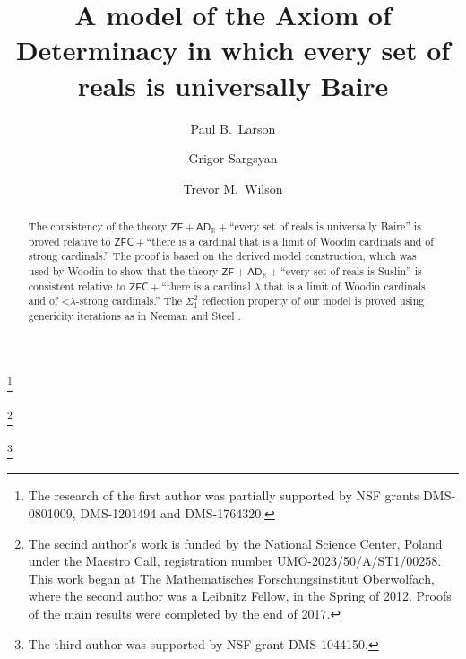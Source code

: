 \documentclass[fleqn, 11pt]{amsart}
\theoremstyle{plain}
\theoremstyle{definition}
\theoremstyle{remark}
\newcommand{\uB}{\mathrm{uB}}
\newcommand{\bbR}{\mathbb{R}}
\newcommand{\ADR}{\mathsf{AD}_{\bbR}}
\begin{document}

\title
[A model of $\mathsf{AD}$ in which every set of reals is $\uB$]
{A model of the Axiom of Determinacy in which every set of reals is universally Baire}

\author{Paul B.\ Larson}\thanks{The research of the first author was partially supported by NSF grants  DMS-0801009, DMS-1201494 and DMS-1764320.}
\address{Department of Mathematics\\ Miami University\\ Oxford, Ohio\\ USA}

\author{Grigor Sargsyan}\thanks{The secind  author’s work is funded by the National Science Center, Poland under the Maestro Call, registration number UMO-2023/50/A/ST1/00258.
This work began at The Mathematisches Forschungsinstitut Oberwolfach, where the second author was a Leibnitz Fellow, in the Spring of 2012. Proofs of the main results were completed by the end of 2017.}
\address{Institute of Mathematics\\
Polish Academy of Sciences\\
8 \'{S}niadeckich Street\\ Warsaw, Poland}

\author{Trevor M.\ Wilson}\thanks{The third author was supported by NSF grant DMS-1044150.}
\address{Department of Mathematics\\ Miami University\\ Oxford, Ohio\\ USA}



\begin{abstract}
The consistency of the theory $\mathsf{ZF} + \ADR + {}$``every set of reals is universally Baire'' is proved relative to $\mathsf{ZFC} + {}$``there is a cardinal that is a limit of Woodin cardinals and of strong cardinals.'' The proof is based on the derived model construction, which was used by Woodin to show  that the theory $\mathsf{ZF} + \ADR + {}$``every set of reals is Suslin'' is consistent relative to  $\mathsf{ZFC} + {}$``there is a cardinal $\lambda$ that is a limit of Woodin cardinals and of $\mathord{<}\lambda$-strong cardinals.'' The $\Sigma^2_1$ reflection property of our model is proved using genericity iterations as in Neeman \cite{NeeHandbook} and Steel \cite{SteSTFree}.
\end{abstract}
\end{document}
